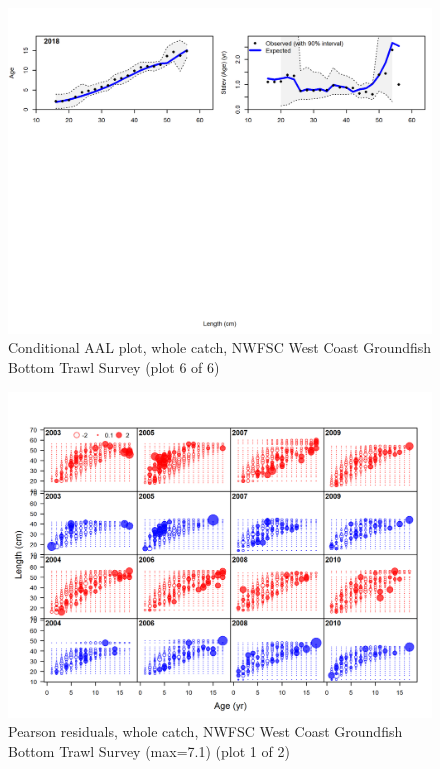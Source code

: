 \documentclass[12pt,]{article}
\begin{document}
\begin{figure}
\centering
\includegraphics{r4ss/plots_mod1/comp_condAALfit_Andre_plotsflt7mkt0_page6.png}
\caption{Conditional AAL plot, whole catch, NWFSC West Coast Groundfish
Bottom Trawl Survey (plot 6 of 6) \label{fig:nwfsc_combo_andre_6}}
\end{figure}

\begin{figure}
\centering
\includegraphics{r4ss/plots_mod1/comp_condAALfit_residsflt7mkt0_page1.png}
\caption{Pearson residuals, whole catch, NWFSC West Coast Groundfish
Bottom Trawl Survey (max=7.1) (plot 1 of 2)
\label{fig:nwfsc_combo_pearson_1}}
\end{figure}
\end{document}
